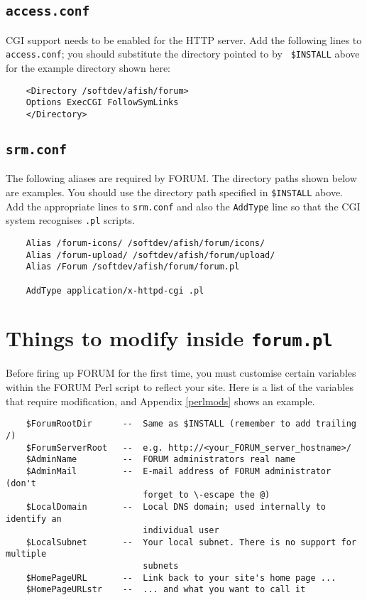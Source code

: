 \documentclass[11pt]{article}
\begin{document}
\subsection{{\tt access.conf}}

CGI support needs to be enabled for the HTTP server. Add the following lines to
{\tt access.conf}; you should substitute the directory pointed to by {\tt
\$INSTALL} above for the example directory shown here:

\begin{verbatim}
    <Directory /softdev/afish/forum>
    Options ExecCGI FollowSymLinks
    </Directory>
\end{verbatim}


\subsection{{\tt srm.conf}}

The following aliases are required by FORUM. The directory paths shown below
are examples. You should use the directory path specified in {\tt \$INSTALL}
above. Add the appropriate lines to {\tt srm.conf} and also the {\tt AddType}
line so that the CGI system recognises {\tt .pl} scripts.

\begin{verbatim}
    Alias /forum-icons/ /softdev/afish/forum/icons/
    Alias /forum-upload/ /softdev/afish/forum/upload/
    Alias /Forum /softdev/afish/forum/forum.pl

    AddType application/x-httpd-cgi .pl
\end{verbatim}


\section{Things to modify inside {\tt forum.pl}}

Before firing up FORUM for the first time, you must customise certain variables
within the FORUM Perl script to reflect your site. Here is a list of the
variables that require modification, and Appendix \ref{perlmods} shows an
example.

\begin{verbatim}
    $ForumRootDir      --  Same as $INSTALL (remember to add trailing /)
    $ForumServerRoot   --  e.g. http://<your_FORUM_server_hostname>/
    $AdminName         --  FORUM administrators real name
    $AdminMail         --  E-mail address of FORUM administrator (don't
                           forget to \-escape the @)
    $LocalDomain       --  Local DNS domain; used internally to identify an
                           individual user
    $LocalSubnet       --  Your local subnet. There is no support for multiple
                           subnets
    $HomePageURL       --  Link back to your site's home page ...
    $HomePageURLstr    --  ... and what you want to call it
\end{verbatim}
\end{document}
